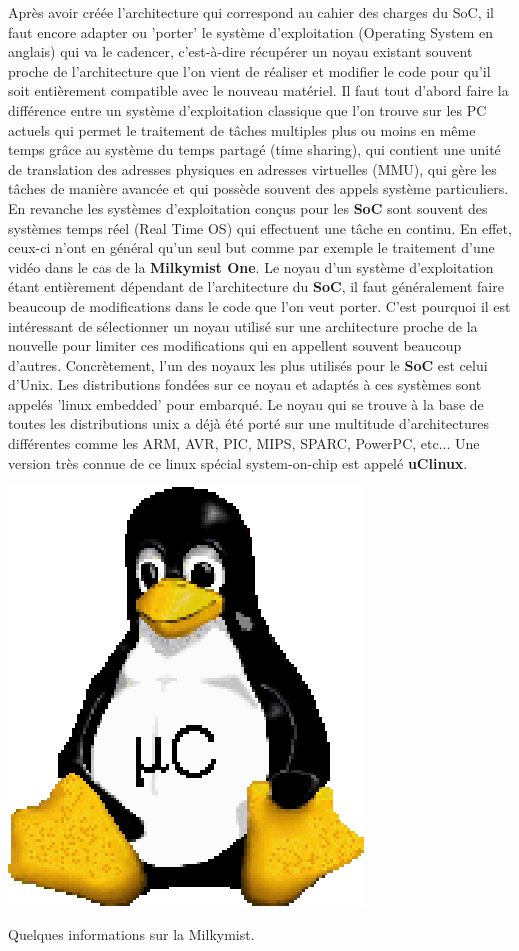 \vspace{15px}
Après avoir créée l'architecture qui correspond au cahier des charges du SoC, il faut encore adapter ou 'porter' le système d'exploitation (Operating System en anglais) qui va le cadencer, c'est-à-dire récupérer un noyau existant souvent proche de l'architecture que l'on vient de réaliser et modifier le code pour qu'il soit entièrement compatible avec le nouveau matériel. 
Il faut tout d'abord faire la différence entre un système d'exploitation classique que l'on trouve sur les PC actuels qui permet le traitement de tâches multiples plus ou moins en même temps grâce au système du temps partagé (time sharing), qui contient une unité de translation des adresses physiques en adresses virtuelles (MMU), qui gère les tâches de manière avancée et qui possède souvent des appels système particuliers. En revanche les systèmes d'exploitation conçus pour les {\bf SoC} sont souvent des systèmes temps réel (Real Time OS) qui effectuent une tâche en continu. En effet, ceux-ci n'ont en général qu'un seul but comme par exemple le traitement d'une vidéo dans le cas de la {\bf Milkymist One}.
\medskip
Le noyau d'un système d'exploitation étant entièrement dépendant de l'architecture du {\bf SoC}, il faut généralement faire beaucoup de modifications dans le code que l'on veut porter. C'est pourquoi il est intéressant de sélectionner un noyau utilisé sur une architecture proche de la nouvelle pour limiter ces modifications qui en appellent souvent beaucoup d'autres.
Concrètement, l'un des noyaux les plus utilisés pour le {\bf SoC} est celui d'Unix. Les distributions fondées sur ce noyau et adaptés à ces systèmes sont appelés 'linux embedded' pour embarqué. Le noyau qui se trouve à la base de toutes les distributions unix a déjà été porté sur une multitude d'architectures différentes comme les ARM, AVR, PIC, MIPS, SPARC, PowerPC, etc... Une version très connue de ce linux spécial system-on-chip est appelé {\bf uClinux}.
\medskip

\begin{center}
\includegraphics[scale=0.4]{uclinux.eps}
\end{center}
\vspace{15px}
{\Large Quelques informations sur la Milkymist.}

